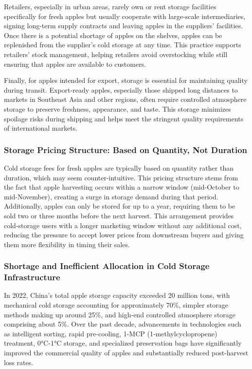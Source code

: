 Retailers, especially in urban areas, rarely own or rent storage facilities specifically for fresh apples but usually cooperate with large-scale intermediaries, signing long-term supply contracts and leaving apples in the suppliers' facilities. Once there is a potential shortage of apples on the shelves, apples can be replenished from the supplier's cold storage at any time. This practice supports retailers' stock management, helping retailers avoid overstocking while still ensuring that apples are available to customers.

Finally, for apples intended for export, storage is essential for maintaining quality during transit. Export-ready apples, especially those shipped long distances to markets in Southeast Asia and other regions, often require controlled atmosphere storage to preserve freshness, appearance, and taste. This storage minimizes spoilage risks during shipping and helps meet the stringent quality requirements of international markets.




\subsubsection{Storage Pricing Structure: Based on Quantity, Not Duration} 
\noindent Cold storage fees for fresh apples are typically based on quantity rather than duration, which may seem counter-intuitive. This pricing structure stems from the fact that apple harvesting occurs within a narrow window (mid-October to mid-November), creating a surge in storage demand during that period. Additionally, apples can only be stored for up to a year, requiring them to be sold two or three months before the next harvest. This arrangement provides cold-storage users with a longer marketing window without any additional cost, reducing the pressure to accept lower prices from downstream buyers and giving them more flexibility in timing their sales.

\subsubsection{Shortage and Inefficient Allocation in Cold Storage Infrastructure} 
\noindent In 2022, China's total apple storage capacity exceeded 20 million tons, with mechanical cold storage accounting for approximately 70\%, simpler storage methods making up around 25\%, and high-end controlled atmosphere storage comprising about 5\%. Over the past decade, advancements in technologies such as intelligent sorting, rapid pre-cooling, 1-MCP (1-methylcyclopropene) treatment, 0°C-1°C storage, and specialized preservation bags have significantly improved the commercial quality of apples and substantially reduced post-harvest loss rates.

